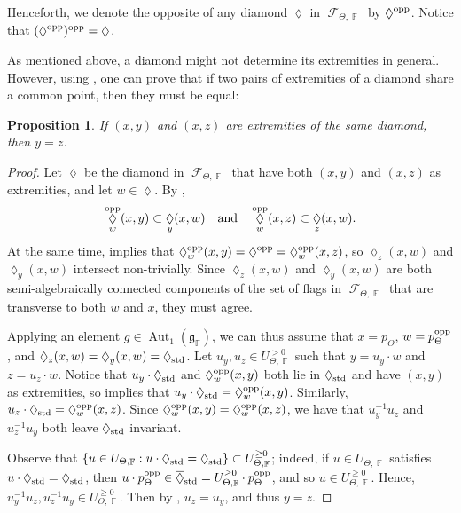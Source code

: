 \documentclass{amsart}
\theoremstyle{plain}
\newtheorem{proposition}{Proposition}[section]
\theoremstyle{definition}
\DeclareMathOperator{\Aut}{Aut}
\DeclareMathOperator{\Diam}{\lozenge}
\DeclareMathOperator{\Fc}{\mathcal{F}}
\DeclareMathOperator{\Fb}{{\mathbb{F}}}
\newcommand{\opp}{\textnormal{opp}}
\newcommand{\std}{\textnormal{std}}
\newcommand{\1}{\mathbf{1}}
\begin{document}
Henceforth, we denote the opposite of any diamond $\Diam$ in $\Fc_{\Theta,\Fb}$ by $\Diam^{\rm opp}$. Notice that $(\Diam^{\rm opp})^{\rm opp}=\Diam$.

As mentioned above, a diamond might not determine its extremities in general. However, using , one can prove that if two pairs of extremities of a diamond share a common point, then they must be equal:

\begin{proposition}
    \label{lem: ExtremitiesDiamonds}
    If $(x,y)$ and $(x,z)$ are extremities of the same diamond, then $y=z$.
\end{proposition}
\begin{proof}
Let $\Diam$ be  the diamond in $\Fc_{\Theta,\Fb}$ that have both $(x,y)$ and $(x,z)$ as extremities, and let $w\in\Diam$. By , 
\[\Diam^\opp_w(x,y) \subset \Diam_y(x,w)\quad\text{and}\quad\Diam^\opp_w(x,z) \subset \Diam_z(x,w).\] 
At the same time,  implies that $\Diam^\opp_w(x,y)=\Diam^{\rm opp}=\Diam^\opp_w(x,z)$, so $\Diam_z(x,w)$ and $\Diam_y(x,w)$ intersect non-trivially. Since $\Diam_z(x,w)$ and $\Diam_y(x,w)$ are both semi-algebraically connected components of the set of flags in $\Fc_{\Theta,\Fb}$ that are transverse to both $w$ and $x$, they must agree.

    Applying an element $g\in \Aut_1(\mathfrak g_{\Fb})$, we can thus assume that $x=p_\Theta$, $w=p_\Theta^{\rm opp}$, and $\Diam_z(x,w)=\Diam_y(x,w)=\Diam_{\rm std}$. Let $u_y, u_z \in U_{\Theta,\Fb}^{>0}$ such that $y = u_y \cdot w$ and $z = u_z \cdot w$. Notice that $u_y\cdot\Diam_{\std}$ and $\Diam^\opp_w(x,y)$ both lie in $\Diam_{\std}$ and have $(x,y)$ as extremities, so  implies that $u_y\cdot\Diam_{\std}=\Diam^\opp_w(x,y)$. Similarly, $u_z \cdot \Diam_\std=\Diam^\opp_w(x,z)$. Since $\Diam^\opp_w(x,y) =\Diam^\opp_w(x,z)$, we have that $u_y^{-1} u_z$ and $u_z^{-1} u_y$ both leave $\Diam_{\std}$ invariant.
    
    Observe that $\{u\in U_{\Theta,\Fb}:u\cdot\Diam_{\std}=\Diam_{\std}\}\subset U_{\Theta,\Fb}^{\ge 0}$; indeed, if $u\in U_{\Theta,\Fb}$ satisfies $u\cdot\Diam_{\std}=\Diam_{\std}$, then $u\cdot p_\Theta^{\rm opp}\in \overline{\Diam}_{\std}=U_{\Theta,\Fb}^{\ge 0}\cdot p_\Theta^{\rm opp}$, and so $u\in U_{\Theta,\Fb}^{\ge 0}$. 
    Hence, $u_y^{-1} u_z, u_z^{-1} u_y \in U_{\Theta,\Fb}^{\geq 0}$.
    Then by , $u_z=u_y$, and thus $y=z$.
\end{proof}
\end{document}
